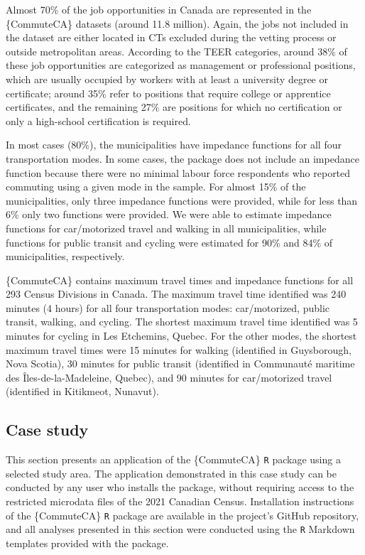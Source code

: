 \documentclass[sn-basic,lineno,pdflatex]{sn-jnl}
\begin{document}
Almost 70\% of the job opportunities in Canada are represented in the
\{CommuteCA\} datasets (around 11.8 million). Again, the jobs not
included in the dataset are either located in CTs excluded during the
vetting process or outside metropolitan areas. According to the TEER
categories, around 38\% of these job opportunities are categorized as
management or professional positions, which are usually occupied by
workers with at least a university degree or certificate; around 35\%
refer to positions that require college or apprentice certificates, and
the remaining 27\% are positions for which no certification or only a
high-school certification is required.

In most cases (80\%), the municipalities have impedance functions for
all four transportation modes. In some cases, the package does not
include an impedance function because there were no minimal labour force
respondents who reported commuting using a given mode in the sample. For
almost 15\% of the municipalities, only three impedance functions were
provided, while for less than 6\% only two functions were provided. We
were able to estimate impedance functions for car/motorized travel and
walking in all municipalities, while functions for public transit and
cycling were estimated for 90\% and 84\% of municipalities,
respectively.

\{CommuteCA\} contains maximum travel times and impedance functions for
all 293 Census Divisions in Canada. The maximum travel time identified
was 240 minutes (4 hours) for all four transportation modes:
car/motorized, public transit, walking, and cycling. The shortest
maximum travel time identified was 5 minutes for cycling in Les
Etchemins, Quebec. For the other modes, the shortest maximum travel
times were 15 minutes for walking (identified in Guysborough, Nova
Scotia), 30 minutes for public transit (identified in Communauté
maritime des Îles-de-la-Madeleine, Quebec), and 90 minutes for
car/motorized travel (identified in Kitikmeot, Nunavut).

\subsection{Case study}\label{case-study}

This section presents an application of the \{CommuteCA\} \texttt{R}
package using a selected study area. The application demonstrated in
this case study can be conducted by any user who installs the package,
without requiring access to the restricted microdata files of the 2021
Canadian Census. Installation instructions of the \{CommuteCA\}
\texttt{R} package are available in the project's GitHub repository, and
all analyses presented in this section were conducted using the
\texttt{R} Markdown templates provided with the package.
\end{document}
